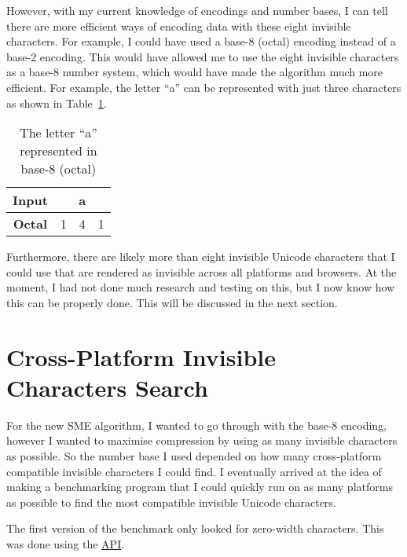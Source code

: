 \documentclass{article}
\begin{document}
However, with my current knowledge of encodings and number bases, I can tell there are more efficient ways of encoding data with these eight invisible characters. For example, I could have used a base-8 (octal) encoding instead of a base-2 encoding. This would have allowed me to use the eight invisible characters as a base-8 number system, which would have made the algorithm much more efficient. For example, the letter ``a'' can be represented with just three characters as shown in Table~\ref{tab:a-base8}.

\begin{table}[H]
  \centering
  \begin{tabular}{cccc}
    \textbf{Input}   & \multicolumn{3}{c}{a} \\ \midrule
    \textbf{Octal}   & 1 & 4 & 1             \\ \midrule
  \end{tabular}
  \caption{The letter ``a'' represented in base-8 (octal)}\label{tab:a-base8}
\end{table}

Furthermore, there are likely more than eight invisible Unicode characters that I could use that are rendered as invisible across all platforms and browsers. At the moment, I had not done much research and testing on this, but I now know how this can be properly done. This will be discussed in the next section.

\section{Cross-Platform Invisible Characters Search}

For the new SME algorithm, I wanted to go through with the base-8 encoding, however I wanted to maximise compression by using as many invisible characters as possible. So the number base I used depended on how many cross-platform compatible invisible characters I could find. I eventually arrived at the idea of making a benchmarking program that I could quickly run on as many platforms as possible to find the most compatible invisible Unicode characters.

The first version of the benchmark only looked for zero-width characters. This was done using the \href{https://developer.mozilla.org/en-US/docs/Web/API/Element/getBoundingClientRect}{ API}.
\end{document}
